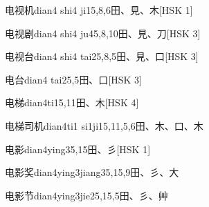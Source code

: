 \begin{EntryWithPhonetic}{电视机}{dian4 shi4 ji1}{5,8,6}{⽥、⾒、⽊}[HSK 1]
\end{EntryWithPhonetic}

\begin{EntryWithPhonetic}{电视剧}{dian4 shi4 ju4}{5,8,10}{⽥、⾒、⼑}[HSK 3]
\end{EntryWithPhonetic}

\begin{EntryWithPhonetic}{电视台}{dian4 shi4 tai2}{5,8,5}{⽥、⾒、⼝}[HSK 3]
\end{EntryWithPhonetic}

\begin{EntryWithPhonetic}{电台}{dian4 tai2}{5,5}{⽥、⼝}[HSK 3]
\end{EntryWithPhonetic}

\begin{EntryWithPhonetic}{电梯}{dian4ti1}{5,11}{⽥、⽊}[HSK 4]
\end{EntryWithPhonetic}

\begin{EntryWithPhonetic}{电梯司机}{dian4ti1 si1ji1}{5,11,5,6}{⽥、⽊、⼝、⽊}
\end{EntryWithPhonetic}

\begin{EntryWithPhonetic}{电影}{dian4ying3}{5,15}{⽥、⼺}[HSK 1]
\end{EntryWithPhonetic}

\begin{EntryWithPhonetic}{电影奖}{dian4ying3jiang3}{5,15,9}{⽥、⼺、⼤}
\end{EntryWithPhonetic}

\begin{EntryWithPhonetic}{电影节}{dian4ying3jie2}{5,15,5}{⽥、⼺、⾋}
\end{EntryWithPhonetic}

